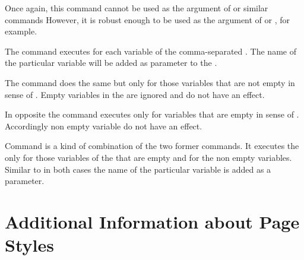 Once again, this command cannot be used as the argument
of  or similar commands However,
it is robust enough to be used as the argument of
 or , for
example.%
%
\EndIndexGroup


\begin{Declaration}
\end{Declaration}
The command
 executes  for each variable of the
comma-separated . The name of the particular variable
will be added as parameter to the .%

The command  does the same but only for those
variables that are not empty in sense of
. Empty variables in the  are ignored and do not have an effect.

In opposite the command  executes 
only for variables that are empty in sense of
. Accordingly non empty variable do not
have an effect.

Command  is a kind of combination of the two
former commands. It executes the  only for those variables
of the  that are empty and  for
the non empty variables. Similar to  in both cases the name of
the particular variable is added as a parameter.%
\EndIndexGroup
%
\EndIndexGroup


\section{Additional Information about Page Styles}
\BeginIndexGroup
{}

%
\EndIndexGroup

\iffalse%
